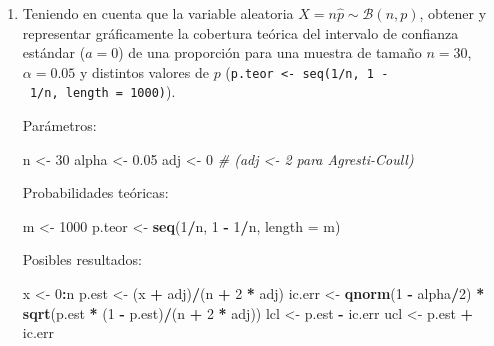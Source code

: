 \documentclass[
]{book}
\newenvironment{Shaded}{\begin{snugshade}}{\end{snugshade}}
\newcommand{\CommentTok}[1]{\textcolor[rgb]{0.56,0.35,0.01}{\textit{#1}}}
\newcommand{\DataTypeTok}[1]{\textcolor[rgb]{0.13,0.29,0.53}{#1}}
\newcommand{\DecValTok}[1]{\textcolor[rgb]{0.00,0.00,0.81}{#1}}
\newcommand{\FloatTok}[1]{\textcolor[rgb]{0.00,0.00,0.81}{#1}}
\newcommand{\KeywordTok}[1]{\textcolor[rgb]{0.13,0.29,0.53}{\textbf{#1}}}
\newcommand{\NormalTok}[1]{#1}
\newcommand{\OperatorTok}[1]{\textcolor[rgb]{0.81,0.36,0.00}{\textbf{#1}}}
\newcommand{\StringTok}[1]{\textcolor[rgb]{0.31,0.60,0.02}{#1}}
\theoremstyle{break}
\theoremstyle{definition}
\theoremstyle{definition}
\theoremstyle{definition}
\theoremstyle{remark}
\begin{document}
\begin{enumerate}
\def\labelenumi{\alph{enumi})}
\item
  Teniendo en cuenta que la variable aleatoria \(X=n\hat{p}\sim\mathcal{B}(n,p)\),
  obtener y representar gráficamente la cobertura teórica del
  intervalo de confianza estándar (\(a=0\)) de una proporción para
  una muestra de tamaño \(n=30\), \(\alpha=0.05\) y distintos valores
  de \(p\) (\texttt{p.teor\ \textless{}-\ seq(1/n,\ 1\ -\ 1/n,\ length\ =\ 1000)}).

  Parámetros:

\begin{Shaded}
\begin{Highlighting}[]
\NormalTok{n <-}\StringTok{ }\DecValTok{30}
\NormalTok{alpha <-}\StringTok{ }\FloatTok{0.05}
\NormalTok{adj <-}\StringTok{ }\DecValTok{0}  \CommentTok{# (adj <- 2 para Agresti-Coull)}
\end{Highlighting}
\end{Shaded}

  Probabilidades teóricas:

\begin{Shaded}
\begin{Highlighting}[]
\NormalTok{m <-}\StringTok{ }\DecValTok{1000}
\NormalTok{p.teor <-}\StringTok{ }\KeywordTok{seq}\NormalTok{(}\DecValTok{1}\OperatorTok{/}\NormalTok{n, }\DecValTok{1} \OperatorTok{-}\StringTok{ }\DecValTok{1}\OperatorTok{/}\NormalTok{n, }\DataTypeTok{length =}\NormalTok{ m) }
\end{Highlighting}
\end{Shaded}

  Posibles resultados:

\begin{Shaded}
\begin{Highlighting}[]
\NormalTok{x <-}\StringTok{ }\DecValTok{0}\OperatorTok{:}\NormalTok{n}
\NormalTok{p.est <-}\StringTok{ }\NormalTok{(x }\OperatorTok{+}\StringTok{ }\NormalTok{adj)}\OperatorTok{/}\NormalTok{(n }\OperatorTok{+}\StringTok{ }\DecValTok{2} \OperatorTok{*}\StringTok{ }\NormalTok{adj) }
\NormalTok{ic.err <-}\StringTok{ }\KeywordTok{qnorm}\NormalTok{(}\DecValTok{1} \OperatorTok{-}\StringTok{ }\NormalTok{alpha}\OperatorTok{/}\DecValTok{2}\NormalTok{) }\OperatorTok{*}\StringTok{ }\KeywordTok{sqrt}\NormalTok{(p.est }\OperatorTok{*}\StringTok{ }\NormalTok{(}\DecValTok{1} \OperatorTok{-}\StringTok{ }\NormalTok{p.est)}\OperatorTok{/}\NormalTok{(n }\OperatorTok{+}\StringTok{ }\DecValTok{2} \OperatorTok{*}\StringTok{ }\NormalTok{adj))  }
\NormalTok{lcl <-}\StringTok{ }\NormalTok{p.est }\OperatorTok{-}\StringTok{ }\NormalTok{ic.err }
\NormalTok{ucl <-}\StringTok{ }\NormalTok{p.est }\OperatorTok{+}\StringTok{ }\NormalTok{ic.err }
\end{Highlighting}
\end{Shaded}


\end{enumerate}
\end{document}
